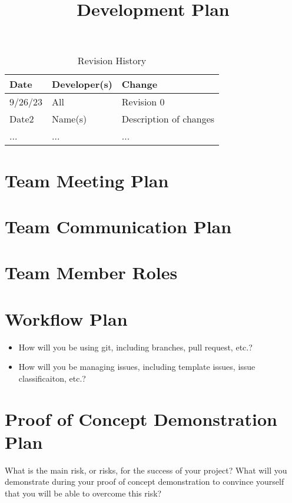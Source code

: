 \documentclass{article}
\title{Development Plan\\\progname}
\author{\authname}
\date{}
\begin{document}
\maketitle

\begin{table}[hp]
\caption{Revision History} \label{TblRevisionHistory}
\begin{tabularx}{\textwidth}{llX}
\toprule
\textbf{Date} & \textbf{Developer(s)} & \textbf{Change}\\
\midrule
9/26/23 & All & Revision 0\\
Date2 & Name(s) & Description of changes\\
... & ... & ...\\
\bottomrule
\end{tabularx}
\end{table}


\section{Team Meeting Plan}

\section{Team Communication Plan}

\section{Team Member Roles}

\section{Workflow Plan}

\begin{itemize}
	\item How will you be using git, including branches, pull request, etc.?
	\item How will you be managing issues, including template issues, issue
	classificaiton, etc.?
\end{itemize}

\section{Proof of Concept Demonstration Plan}

What is the main risk, or risks, for the success of your project?  What will you
demonstrate during your proof of concept demonstration to convince yourself that
you will be able to overcome this risk?
\end{document}
